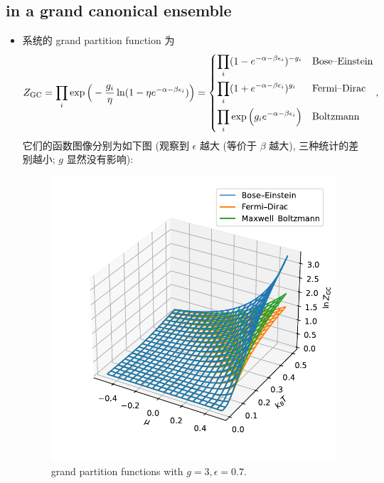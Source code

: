 \subsection{in a grand canonical ensemble}
\begin{itemize}
	\item 系统的 grand partition function 为
	\begin{equation} \label{6.1.10}
		Z_\text{GC} = \prod_i \exp \Big( - \frac{g_i}{\eta} \ln(1 - \eta e^{- \alpha - \beta \epsilon_i}) \Big) = \begin{dcases}
			\prod_i (1 - e^{- \alpha - \beta \epsilon_i})^{- g_i} & \text{Bose--Einstein} \\
			\prod_i (1 + e^{- \alpha - \beta \epsilon_i})^{g_i} & \text{Fermi--Dirac} \\
			\prod_i \exp \Big( g_i e^{- \alpha - \beta \epsilon_i} \Big) & \text{Boltzmann}
		\end{dcases},
	\end{equation}
	它们的函数图像分别为如下图 (观察到 $\epsilon$ 越大 (等价于 $\beta$ 越大), 三种统计的差别越小; $g$ 显然没有影响):
	
	\begin{figure}[H]
		\centering
		\includegraphics[scale=0.75]{figures/grand partition functions with g = 3, epsilon = 0.7.pdf}
		\caption{grand partition functions with $g = 3, \epsilon = 0.7$.}
	\end{figure}
	

\end{itemize}
